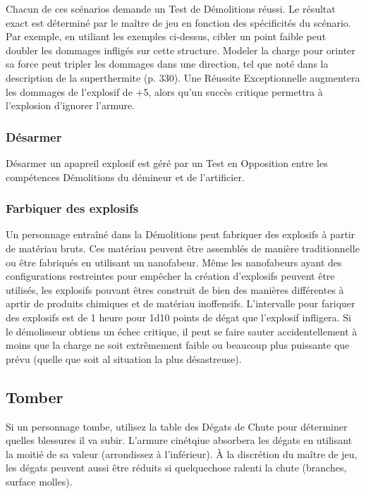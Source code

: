 Chacun de ces scénarios demande un Test de Démolitions réussi. Le résultat exact est déterminé par le maître de jeu en fonction des spécificités du scénario. Par exemple, en utiliant les exemples ci-dessus, cibler un point faible peut doubler les dommages infligés sur cette structure. Modeler la charge pour orinter sa force peut tripler les dommages dans une direction, tel que noté dans la description de la superthermite (p. 330). Une Réussite Exceptionnelle augmentera les dommages de l'explosif de +5, alors qu'un succès critique permettra à l'explosion d'ignorer l'armure. 

\subsubsection{Désarmer} 

Désarmer un apapreil explosif est géré par un Test en Opposition entre les compétences Démolitions du démineur et de l'artificier. 

\subsubsection{Farbiquer des explosifs} 

Un personnage entraîné dans la Démolitions peut fabriquer des explosifs à partir de matériau bruts. Ces matériau peuvent être assemblés de manière traditionnelle ou être fabriqués en utilisant un nanofabeur. Même les nanofabeurs ayant des configurations restreintes pour empêcher la création d'explosifs peuvent être utilisés, les explosifs pouvant êtres construit de bien des manières différentes à aprtir de produits chimiques et de matériau inoffensifs. L'intervalle pour fariquer des explosifs est de 1 heure pour 1d10 points de dégat que l'explosif infligera. Si le démolisseur obtiens un échec critique, il peut se faire sauter accidentellement à moins que la charge ne soit extrêmement faible ou beaucoup plus puissante que prévu (quelle que soit al situation la plus désastreuse). 

\subsection{Tomber} \label{sec:falling} 

Si un personnage tombe, utilisez la table des Dégats de Chute pour déterminer quelles blessures il va subir. L'armure cinétqiue absorbera les dégats en utilisant la moitié de sa valeur (arrondissez à l'inférieur). À la discrétion du maître de jeu, les dégats peuvent aussi être réduits si quelquechose ralenti la chute (branches, surface molles). 

